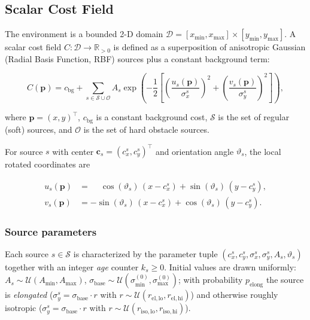 \documentclass[11pt,a4paper]{article}
\begin{document}
\subsection{Scalar Cost Field}

The environment is a bounded 2-D domain
$\mathcal{D} = [x_{\min}, x_{\max}] \times [y_{\min}, y_{\max}]$.
A scalar cost field $C : \mathcal{D} \to \mathbb{R}_{>0}$ is defined as a
superposition of anisotropic Gaussian (Radial Basis Function, RBF) sources plus
a constant background term:

\begin{equation}
  \label{eq:cost_field}
  C(\mathbf{p}) = c_{\mathrm{bg}} + \sum_{s \in \mathcal{S} \cup \mathcal{O}}
    A_s \exp\!\left(
      -\frac{1}{2}\left[
        \left(\frac{u_s(\mathbf{p})}{\sigma_x^s}\right)^{\!2}
        + \left(\frac{v_s(\mathbf{p})}{\sigma_y^s}\right)^{\!2}
      \right]
    \right),
\end{equation}

where $\mathbf{p} = (x, y)^\top$, $c_{\mathrm{bg}}$ is a constant background
cost, $\mathcal{S}$ is the set of regular (soft) sources, and $\mathcal{O}$ is
the set of hard obstacle sources.

For source $s$ with center $\mathbf{c}_s = (c_x^s, c_y^s)^\top$ and
orientation angle $\vartheta_s$, the local rotated coordinates are

\begin{align}
  u_s(\mathbf{p}) &= \phantom{-}\cos(\vartheta_s)\,(x - c_x^s) + \sin(\vartheta_s)\,(y - c_y^s), \\
  v_s(\mathbf{p}) &= -\sin(\vartheta_s)\,(x - c_x^s) + \cos(\vartheta_s)\,(y - c_y^s).
\end{align}

\subsubsection*{Source parameters}

Each source $s \in \mathcal{S}$ is characterized by the parameter tuple
$(c_x^s, c_y^s, \sigma_x^s, \sigma_y^s, A_s, \vartheta_s)$ together with an
integer \emph{age} counter $k_s \ge 0$.
Initial values are drawn uniformly:
$A_s \sim \mathcal{U}(A_{\min}, A_{\max})$,
$\sigma_{\mathrm{base}} \sim \mathcal{U}(\sigma_{\min}^{(0)}, \sigma_{\max}^{(0)})$;
with probability $p_{\mathrm{elong}}$ the source is \emph{elongated}
($\sigma_y^s = \sigma_{\mathrm{base}} \cdot r$ with
$r \sim \mathcal{U}(r_{\mathrm{el,lo}}, r_{\mathrm{el,hi}})$)
and otherwise roughly isotropic
($\sigma_y^s = \sigma_{\mathrm{base}} \cdot r$ with
$r \sim \mathcal{U}(r_{\mathrm{iso,lo}}, r_{\mathrm{iso,hi}})$).
\end{document}
